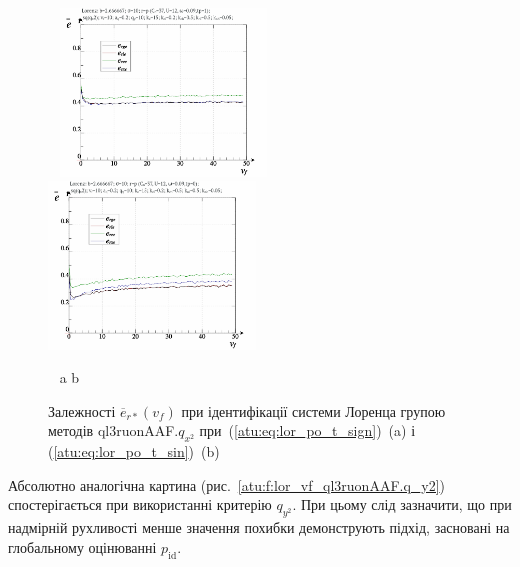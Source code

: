 \begin{figure}[ht!]
  \begin{center}
    ~ \hfill
    \includegraphics[width=0.49\textwidth]{p/cha/lor/ql3ruonAAF/lor_ql3ruonAAF_qx2-p_v_f_e_sign.png}
    \hfill
    \includegraphics[width=0.49\textwidth]{p/cha/lor/ql3ruonAAF/lor_ql3ruonAAF_qx2-p_v_f_e_sin.png}
    \hfill ~
  \end{center}
  \vspace{-1.0ex}
  \begin{center}
    ~ \hfill a \hfill\hfill b \hfill ~
  \end{center}
  \vspace{-1.5ex}
  \caption{Залежності $ \overline{e}_{r *} (v_f) $ при ідентифікації системи Лоренца групою методів ql3ruonAAF.$q_{x^2} $ при~(\ref{atu:eq:lor_po_t_sign})~(a) і (\ref{atu:eq:lor_po_t_sin})~(b)}
  \label{atu:f:lor_vf_ql3ruonAAF.q_x2}
\end{figure}

Абсолютно аналогічна картина (рис.~\ref{atu:f:lor_vf_ql3ruonAAF.q_y2})
спостерігається при використанні критерію
$q_{y^2}$.
При цьому слід зазначити, що при надмірній рухливості менше
значення похибки демонструють підхід, засновані на глобальному
оцінюванні
$ p_\mathrm{id} $.



